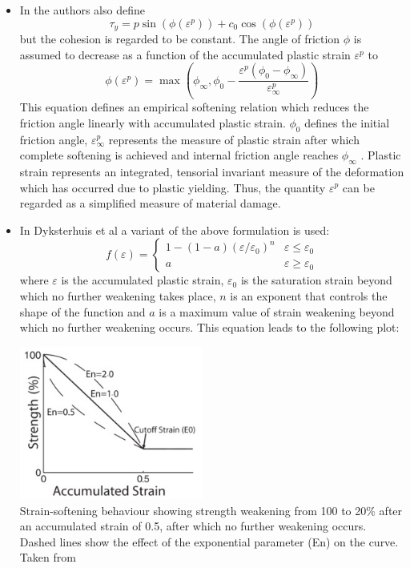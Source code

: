 \begin{itemize}
\item In \cite{lemh17} the authors also define 
\[
\tau_y = p \sin (\phi(\varepsilon^p))  + c_0 \cos(\phi(\varepsilon^p))
\]
but the cohesion is regarded to be constant. 
The angle of friction $\phi$ is assumed to decrease as a function of the accumulated plastic
strain $\varepsilon^p$ to
\[
\phi(\varepsilon^p) 
=
\max \left(
\phi_\infty , \phi_0 - \frac{\varepsilon^p (\phi_0-\phi_\infty)}{\varepsilon^p_\infty}
\right)
\]
This equation defines an empirical softening relation which reduces the
friction angle linearly with accumulated plastic strain.
$\phi_0$ defines the initial friction angle, $\varepsilon^p_\infty$
represents the measure of plastic strain after which complete softening is achieved and internal
friction angle reaches $\phi_\infty$ . Plastic strain represents an integrated,
tensorial invariant measure of the deformation which has occurred
due to plastic yielding. Thus, the quantity $\varepsilon^p$ can be regarded as
a simplified measure of material damage. 


\item In Dyksterhuis et al \cite{dyrm07} a variant of the above formulation is used:
\[
f(\varepsilon)=
\left\{
\begin{array}{cc} 
1-(1-a)(\varepsilon/\varepsilon_0)^n & \varepsilon \leq \varepsilon_0 \\
a &  \varepsilon \geq \varepsilon_0 
\end{array}
\right.
\]
where $\varepsilon$ is the accumulated plastic strain, $\varepsilon_0$ is the
saturation strain beyond which no further weakening
takes place, $n$ is an exponent that controls the shape
of the function and $a$ is a maximum value of strain
weakening beyond which no further weakening
occurs. This equation leads to the following plot:

\begin{center}
\includegraphics[width=6cm]{images/strainweakening/dyrm07}\\
{\tiny Strain-softening behaviour showing strength weakening from 100 to 20\% 
after an accumulated strain of 0.5, after which no further weakening occurs. 
Dashed lines show the effect of the exponential parameter
(En) on the curve. Taken from \cite{dyrm07}}
\end{center}


\end{itemize}
